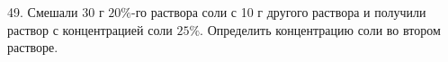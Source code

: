 49. Смешали 30 г $20\%$-го раствора соли с 10 г другого раствора и получили раствор с концентрацией соли $25\%.$ Определить концентрацию соли во втором растворе.\\
